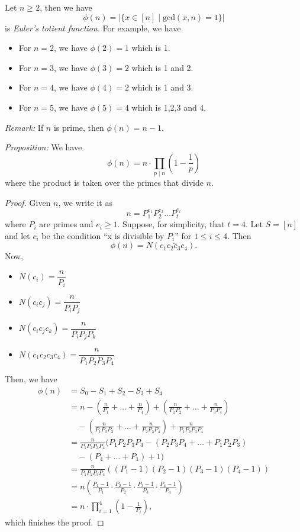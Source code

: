 \documentclass[11pt]{article}
\begin{document}
    Let \(n \geq 2\), then we have \[\phi (n) = |\{x \in [n] \mid \text{gcd}(x,n) = 1\}|\] is \emph{Euler's totient function}. For example, we have 
    \begin{itemize}
        \item For \(n=2\), we have \(\phi(2) = 1\) which is 1.
        \item For \(n=3\), we have \(\phi(3) = 2\) which is 1 and 2.
        \item For \(n=4\), we have \(\phi(4) = 2\) which is 1 and 3.
        \item For \(n=5\), we have \(\phi(5) = 4\) which is 1,2,3 and 4.
    \end{itemize}

    \emph{Remark:} If $n$ is prime, then \(\phi(n) = n-1\).

    \vspace{1em}

    \emph{Proposition:} We have \[\phi(n) = n \cdot \prod_{p \mid n} (1 - \frac{1}{p})\] where the product is taken over the primes that divide $n$.

    \begin{proof}
        Given $n$, we write it as \[n = P_1^{e_1} P_2^{e_2} \dots P_t^{e_t}\] where \(P_i\) are primes and \(e_i \geq 1\). Suppose, for simplicity, that \(t = 4\). Let \(S = [n]\) and let \(c_i\) be the condition ``x is divisible by \(P_i\)'' for \(1 \leq i \leq 4\). Then \[\phi(n) = N(\overline{c_1 c_2 c_3 c_4}).\] Now, 
        \begin{itemize}
            \item \(N(c_i) = \dfrac{n}{P_i}\)
            \item \(N(c_i c_j) = \dfrac{n}{P_i P_j}\)
            \item \(N(c_i c_j c_k) = \dfrac{n}{P_i P_j P_k}\)
            \item \(N(c_1 c_2 c_3 c_4) = \dfrac{n}{P_1 P_2 P_3 P_4}\)
        \end{itemize}
        Then, we have 
        \begin{align*}
            \phi(n) &= S_0 - S_1 + S_2 - S_3 + S_4 \\
                    &= n - \left( \frac{n}{P_1} + \dots + \frac{n}{P_4} \right) + \left(\frac{n}{P_1 P_2} + \dots + \frac{n}{P_3 P_4}\right) \\
                    & \quad - \left(\frac{n}{P_1 P_2 P_3} + \dots + \frac{n}{P_2 P_3 P_4}\right) + \frac{n}{P_1 P_2 P_3 P_4} \\
                    &= \frac{n}{P_1 P_2 P_3 P_4} ( P_1 P_2 P_3 P_4 - (P_2 P_3 P_4 + \dots + P_1 P_2 P_3) \\
                    & \quad - (P_4 + \dots + P_1) + 1 ) \\
                    &= \frac{n}{P_1 P_2 P_3 P_4} ((P_1 - 1) (P_2 - 1) (P_3 - 1) (P_4 - 1)) \\
                    &= n \left(\frac{P_1 - 1}{P_1} \cdot \frac{P_2 - 1}{P_2} \cdot \frac{P_3 - 1}{P_3} \cdot \frac{P_4 - 1}{P_4}\right) \\ 
                    &= n \cdot \prod_{i=1}^{4} \left( 1 - \frac{1}{P_i}\right),
        \end{align*}
        which finishes the proof.
    \end{proof}
\end{document}

